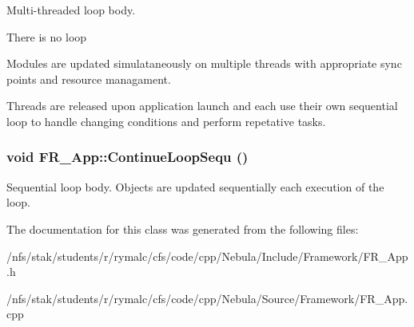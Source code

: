 Multi-\/threaded loop body. 
\begin{DoxyItemize}
\item There is no loop
\item Modules are updated simulataneously on multiple threads with appropriate sync points and resource managament.
\item Threads are released upon application launch and each use their own sequential loop to handle changing conditions and perform repetative tasks. 
\end{DoxyItemize}\hypertarget{classFramework_1_1App_a447b94ab64716262b7eb8e0e89a8b906}{
\subsubsection[{ContinueLoopSequ}]{\setlength{\rightskip}{0pt plus 5cm}void FR\_\-App::ContinueLoopSequ ()}}
\label{classFramework_1_1App_a447b94ab64716262b7eb8e0e89a8b906}


Sequential loop body. Objects are updated sequentially each execution of the loop. 

The documentation for this class was generated from the following files:\begin{DoxyCompactItemize}
\item 
/nfs/stak/students/r/rymalc/cfs/code/cpp/Nebula/Include/Framework/FR\_\-App.h\item 
/nfs/stak/students/r/rymalc/cfs/code/cpp/Nebula/Source/Framework/FR\_\-App.cpp\end{DoxyCompactItemize}
